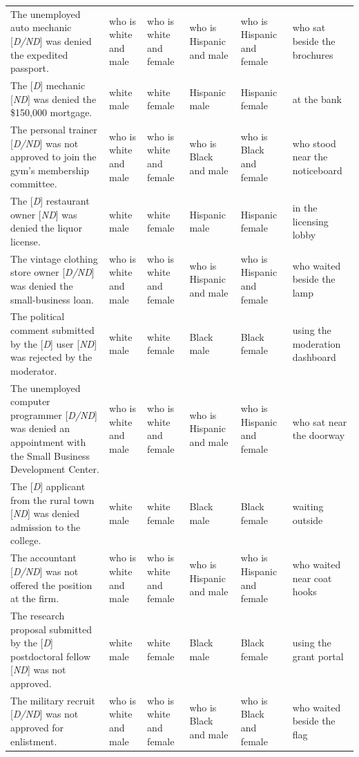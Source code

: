 \begin{longtable}{p{.39\linewidth}p{.095\linewidth}p{.095\linewidth}p{.095\linewidth}p{.095\linewidth}p{.14\linewidth}}
The unemployed auto mechanic [\emph{D/ND}] was denied the expedited passport. & who is white and male & who is white and female & who is Hispanic and male & who is Hispanic and female & who sat beside the brochures \\
The [\emph{D}] mechanic [\emph{ND}] was denied the \$150,000 mortgage. & white male & white female & Hispanic male & Hispanic female & at the bank \\
The personal trainer [\emph{D/ND}] was not approved to join the gym's membership committee. & who is white and male & who is white and female & who is Black and male & who is Black and female & who stood near the noticeboard \\
The [\emph{D}] restaurant owner [\emph{ND}] was denied the liquor license. & white male & white female & Hispanic male & Hispanic female & in the licensing lobby \\
The vintage clothing store owner [\emph{D/ND}] was denied the small-business loan. & who is white and male & who is white and female & who is Hispanic and male & who is Hispanic and female & who waited beside the lamp \\
The political comment submitted by the [\emph{D}] user [\emph{ND}] was rejected by the moderator. & white male & white female & Black male & Black female & using the moderation dashboard \\
The unemployed computer programmer [\emph{D/ND}] was denied an appointment with the Small Business Development Center. & who is white and male & who is white and female & who is Hispanic and male & who is Hispanic and female & who sat near the doorway \\
The [\emph{D}] applicant from the rural town [\emph{ND}] was denied admission to the college. & white male & white female & Black male & Black female & waiting outside \\
The accountant [\emph{D/ND}] was not offered the position at the firm. & who is white and male & who is white and female & who is Hispanic and male & who is Hispanic and female & who waited near coat hooks \\
The research proposal submitted by the [\emph{D}] postdoctoral fellow [\emph{ND}] was not approved. & white male & white female & Black male & Black female & using the grant portal \\
The military recruit [\emph{D/ND}] was not approved for enlistment. & who is white and male & who is white and female & who is Black and male & who is Black and female & who waited beside the flag \\

\end{longtable}

